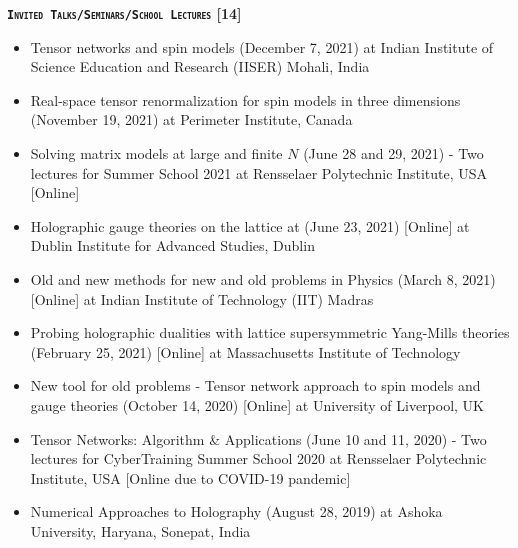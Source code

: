 \renewcommand\ttdefault{cmvtt}
\textcolor{alizarin}{\textbf{\textsc{\fontsize{12}{48} \bfseries \texttt{Invited Talks/Seminars/School Lectures} [14]}}}

\begin{itemize}
 \item Tensor networks and spin models 
 (December 7, 2021) at Indian Institute of Science Education and Research (IISER) Mohali, India 
 \href{https://rgjha.github.io/talks/IISERM_071221.pdf}{{\texttt{}}} 
  \item Real-space tensor renormalization for spin models in three dimensions 
 (November 19, 2021) at Perimeter Institute, Canada
 \item Solving matrix models at large and finite $N$ (June 28 and 29, 2021) - Two lectures for 
Summer School 2021 at Rensselaer Polytechnic Institute, USA [Online] 
 \href{https://rgjha.github.io/talks/RPI_2021_Lec1_2.pdf}{{\texttt{\COL{[Lecture 1 \& 2]}}}}  
 \item Holographic gauge theories on the lattice at 
 (June 23, 2021) [Online] at Dublin Institute for Advanced Studies, Dublin
 \href{https://rgjha.github.io/talks/DIAS_230621.pdf}{{\texttt{}}} 
  \href{https://youtu.be/JzeWm-ykDPk}{{\texttt{}}}
 \item Old and new methods for new and old problems in Physics
 (March 8, 2021) [Online] at Indian Institute of Technology (IIT) Madras
 \href{https://rgjha.github.io/talks/Collo_IITM.pdf}{{\texttt{}}} 
 \item Probing holographic dualities with lattice supersymmetric Yang-Mills theories 
 (February 25, 2021) [Online] at Massachusetts Institute of Technology
 \href{https://rgjha.github.io/talks/MIT_v2.pdf}{{\texttt{}}} 
 \href{http://y2u.be/fO8A18uwYIM}{{\texttt{}}}
 \item New tool for old problems - Tensor network approach to spin models and gauge theories 
 (October 14, 2020) [Online] at University of Liverpool, UK
 \href{https://rgjha.github.io/talks/Seminar_v2.pdf}{{\texttt{}}} 
 \item Tensor Networks: Algorithm \& Applications (June 10 and 11, 2020) - Two lectures for 
 CyberTraining Summer School 2020 at Rensselaer Polytechnic Institute, USA [Online due to COVID-19 pandemic] 
 \href{https://rgjha.github.io/talks/cs2020.pdf}{{\texttt{\COL{[Lecture 1 \& 2]}}}} 
 \item Numerical Approaches to Holography (August 28, 2019) at Ashoka University, Haryana, Sonepat, India

\end{itemize}
